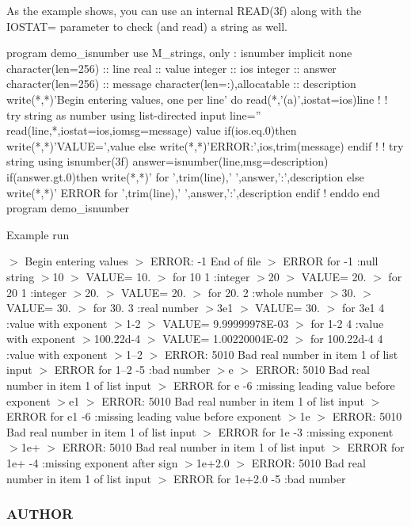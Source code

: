 As the example shows, you can use an internal R\+E\+A\+D(3f) along with the I\+O\+S\+T\+AT= parameter to check (and read) a string as well. \begin{DoxyVerb} program demo_isnumber
 use M_strings, only : isnumber
 implicit none
 character(len=256) :: line
 real               :: value
 integer            :: ios
 integer            :: answer
 character(len=256) :: message
 character(len=:),allocatable :: description
    write(*,*)'Begin entering values, one per line'
    do
       read(*,'(a)',iostat=ios)line
       !
       ! try string as number using list-directed input
       line=''
       read(line,*,iostat=ios,iomsg=message) value
       if(ios.eq.0)then
          write(*,*)'VALUE=',value
       else
          write(*,*)'ERROR:',ios,trim(message)
       endif
       !
       ! try string using isnumber(3f)
       answer=isnumber(line,msg=description)
       if(answer.gt.0)then
          write(*,*)' for ',trim(line),' ',answer,':',description
       else
          write(*,*)' ERROR for ',trim(line),' ',answer,':',description
       endif
       !
    enddo
 end program demo_isnumber
\end{DoxyVerb}


Example run

$>$ Begin entering values $>$ E\+R\+R\+OR\+: -\/1 End of file $>$ E\+R\+R\+OR for -\/1 \+:null string $>$10 $>$ V\+A\+L\+UE= 10. $>$ for 10 1 \+:integer $>$20 $>$ V\+A\+L\+UE= 20. $>$ for 20 1 \+:integer $>$20. $>$ V\+A\+L\+UE= 20. $>$ for 20. 2 \+:whole number $>$30. $>$ V\+A\+L\+UE= 30. $>$ for 30. 3 \+:real number $>$3e1 $>$ V\+A\+L\+UE= 30. $>$ for 3e1 4 \+:value with exponent $>$1-\/2 $>$ V\+A\+L\+UE= 9.\+99999978E-\/03 $>$ for 1-\/2 4 \+:value with exponent $>$100.\+22d-\/4 $>$ V\+A\+L\+UE= 1.\+00220004E-\/02 $>$ for 100.\+22d-\/4 4 \+:value with exponent $>$1--2 $>$ E\+R\+R\+OR\+: 5010 Bad real number in item 1 of list input $>$ E\+R\+R\+OR for 1--2 -\/5 \+:bad number $>$e $>$ E\+R\+R\+OR\+: 5010 Bad real number in item 1 of list input $>$ E\+R\+R\+OR for e -\/6 \+:missing leading value before exponent $>$e1 $>$ E\+R\+R\+OR\+: 5010 Bad real number in item 1 of list input $>$ E\+R\+R\+OR for e1 -\/6 \+:missing leading value before exponent $>$1e $>$ E\+R\+R\+OR\+: 5010 Bad real number in item 1 of list input $>$ E\+R\+R\+OR for 1e -\/3 \+:missing exponent $>$1e+ $>$ E\+R\+R\+OR\+: 5010 Bad real number in item 1 of list input $>$ E\+R\+R\+OR for 1e+ -\/4 \+:missing exponent after sign $>$1e+2.0 $>$ E\+R\+R\+OR\+: 5010 Bad real number in item 1 of list input $>$ E\+R\+R\+OR for 1e+2.0 -\/5 \+:bad number \subsubsection*{A\+U\+T\+H\+OR}

